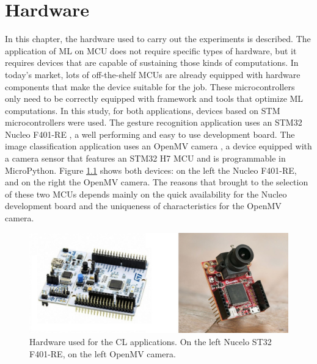 \documentclass[12pt]{report}
\begin{document}
\chapter{Hardware} 
\label{hardware}
In this chapter, the hardware used to carry out the experiments is described. The application of ML on MCU does not require specific types of hardware, but it requires devices that are capable of sustaining those kinds of computations. In today's market, lots of off-the-shelf MCUs are already equipped with hardware components that make the device suitable for the job. These microcontrollers only need to be correctly equipped with framework and tools that optimize ML computations. In this study, for both applications, devices based on STM microcontrollers were used. The gesture recognition application uses an STM32 Nucleo F401-RE \autocite{nucleo_datasheet}, a well performing and easy to use development board. The image classification application uses an OpenMV camera \autocite{openmv_datasheet}, a device equipped with a camera sensor that features an STM32 H7 MCU and is programmable in MicroPython. Figure \ref{fig:hardware_all} shows both devices: on the left the Nucleo F401-RE, and on the right the OpenMV camera. The reasons that brought to the selection of these two MCUs depends mainly on the quick availability for the Nucleo development board and the uniqueness of characteristics for the OpenMV camera.

\begin{figure}[h!]
    \centering
    \includegraphics[width=120mm]{Figures/Chapter2/hardware.jpg} 
    \caption{Hardware used for the CL applications. On the left Nucelo ST32 F401-RE, on the left OpenMV camera.}
    \label{fig:hardware_all}    
\end{figure}
\end{document}
